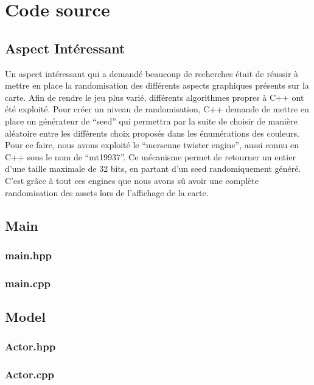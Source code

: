 \section{Code source}

\subsection{Aspect Intéressant}
Un aspect intéressant qui a demandé beaucoup de recherches était de réussir à mettre en place la randomisation des différents aspects graphiques présents sur la carte.
Afin de rendre le jeu plus varié, différents algorithmes propres à C++ ont été exploité.
Pour créer un niveau de randomisation, C++ demande de mettre en place un générateur de \enquote{seed} qui permettra par la suite de choisir de manière aléatoire entre les différents choix proposés dans les énumérations des couleurs.
Pour ce faire, nous avons exploité le \enquote{mersenne twister engine}, aussi connu en C++ sous le nom de \enquote{mt19937}.
Ce mécanisme permet de retourner un entier d'une taille maximale de 32 bits, en partant d'un seed randomiquement généré.
C'est grâce à tout ces engines que nous avons sû avoir une complète randomisation des assets lors de l'affichage de la carte.

\subsection{Main}
\subsubsection{main.hpp}

\subsubsection{main.cpp}


\subsection{Model}
\subsubsection{Actor.hpp}

\subsubsection{Actor.cpp}

